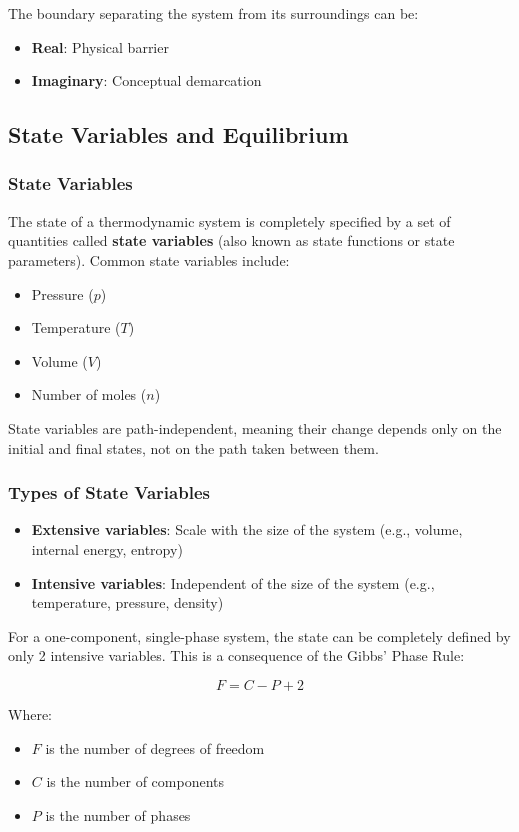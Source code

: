 \documentclass{article}
\theoremstyle{definition}
\begin{document}
The boundary separating the system from its surroundings can be:
\begin{itemize}
    \item \textbf{Real}: Physical barrier
    \item \textbf{Imaginary}: Conceptual demarcation
\end{itemize}

\subsection{State Variables and Equilibrium}

\subsubsection{State Variables}
The state of a thermodynamic system is completely specified by a set of quantities called \textbf{state variables} (also known as state functions or state parameters). Common state variables include:

\begin{itemize}
    \item Pressure ($p$)
    \item Temperature ($T$)
    \item Volume ($V$)
    \item Number of moles ($n$)
\end{itemize}

State variables are path-independent, meaning their change depends only on the initial and final states, not on the path taken between them.

\subsubsection{Types of State Variables}
\begin{itemize}
    \item \textbf{Extensive variables}: Scale with the size of the system (e.g., volume, internal energy, entropy)
    \item \textbf{Intensive variables}: Independent of the size of the system (e.g., temperature, pressure, density)
\end{itemize}

For a one-component, single-phase system, the state can be completely defined by only 2 intensive variables. This is a consequence of the Gibbs' Phase Rule:

\[
F = C - P + 2
\]

Where:
\begin{itemize}
    \item $F$ is the number of degrees of freedom
    \item $C$ is the number of components
    \item $P$ is the number of phases
\end{itemize}
\end{document}
